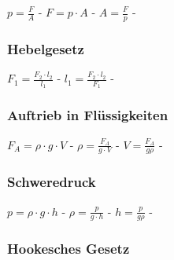 $ p = \frac{F}{A} $ - $ F = p\cdot A $ - $ A = \frac{F}{p} $ - \\ 
 
\subsubsection{Hebelgesetz} 
\begin{minipage}{0.45\textwidth} 
\end{minipage} 
\begin{minipage}{0.45\textwidth} 
 
\legende{}\end{minipage} 
 
$ F_{1}  = \frac{F_{2} \cdot l_{2} }{ l_{1} } $ - $ l_{1}  = \frac{F_{2} \cdot l_{2} }{ F_{1} } $ - \\ 
 
\subsubsection{Auftrieb in Flüssigkeiten} 
\begin{minipage}{0.45\textwidth} 
\end{minipage} 
\begin{minipage}{0.45\textwidth} 
 
\legende{}\end{minipage} 
 
$ F_{A}  =  \rho \cdot g\cdot V $ - $ \rho  = \frac{F_{A} }{g\cdot V} $ - $ V = \frac{F_{A} }{g \rho } $ - \\ 
 
\subsubsection{Schweredruck} 
\begin{minipage}{0.45\textwidth} 
\end{minipage} 
\begin{minipage}{0.45\textwidth} 
 
\legende{}\end{minipage} 
 
$ p =  \rho \cdot g\cdot h $ - $ \rho  = \frac{p}{g\cdot h} $ - $ h = \frac{p}{g \rho } $ - \\ 
 
\subsubsection{Hookesches Gesetz} 
\begin{minipage}{0.45\textwidth} 
\end{minipage} 
\begin{minipage}{0.45\textwidth} 
 
\legende{}\end{minipage} 
 
